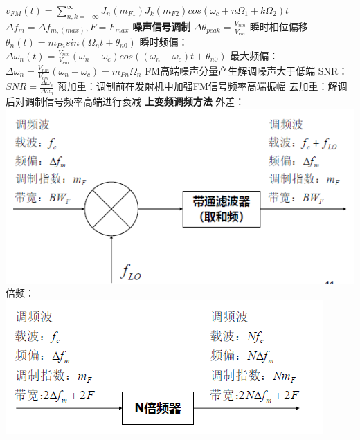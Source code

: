 \documentclass[10.5pt,landscape]{article}
\begin{document}
\begin{multicols*}{4}
$v_{FM}(t) = \sum_{n,k=-\infty}^{\infty} J_n(m_{F1})J_k(m_{F2})cos(\omega_c + n\Omega_1 + k\Omega_2)t$\newline
$\Delta f_m = \Delta f_{m, (max)}, F = F_{max}$ \newline
\textbf{噪声信号调制}\newline
$\Delta \theta_{peak} = \frac{V_{nm}}{V_{cm}}$ \newline
瞬时相位偏移 $\theta_n(t) = m_{Pn}sin(\Omega_n t + \theta_{n0})$\newline
瞬时频偏：$\Delta \omega_n(t) = \frac{V_{nm}}{V_{cm}}(\omega_n - \omega_c)cos((\omega_n - \omega_c)t + \theta_{n0})$\newline
最大频偏：$\Delta \omega_n = \frac{V_{nm}}{V_{cm}}(\omega_n - \omega_c) = m_{Pn}\Omega_n$ \newline
FM高端噪声分量产生解调噪声大于低端\newline
SNR： $SNR = \frac{\Delta \omega_s}{\Delta \omega_n}$\newline
预加重：调制前在发射机中加强FM信号频率高端振幅 \newline
去加重：解调后对调制信号频率高端进行衰减 \newline
\textbf{上变频调频方法}\newline
外差：
 \includegraphics[scale=0.4]{外差}\newline
 倍频：
  \includegraphics[scale=0.4]{倍频}\newline

\end{multicols*}
\end{document}
